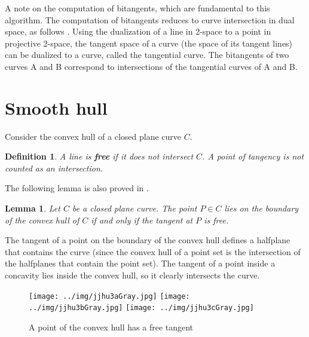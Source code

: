 \documentclass{sig-alternate}
\newcommand{\QED}{\vrule height 1.4ex width 1.0ex depth -.1ex\ \vspace{.3in}} %
\newcommand{\prf}{\noindent{{\bf Proof}:\ \ \ }}
\newtheorem{lemma}[theorem]{Lemma}
\newtheorem{defn2}[theorem]{Definition}
\begin{document}
A note on the computation of bitangents, which are fundamental to this algorithm.
The computation of bitangents reduces to curve intersection in dual space, as follows
\cite{jj01}.
Using the dualization of a line in 2-space to a point in projective 2-space,
the tangent space of a curve (the space of its tangent lines) can be dualized
to a curve, called the tangential curve.
The bitangents of two curves A and B 
correspond to intersections of the tangential curves of A and B.


\section{Smooth hull}
\label{sec:hull}

Consider the convex hull of a closed plane curve $C$.

\begin{defn2}
A line is {\bf free} if it does not intersect $C$.
A point of tangency is not counted as an intersection.
\end{defn2}

The following lemma is also proved in \cite{elber01}. 

\begin{lemma}
\label{lem:condition}
Let $C$ be a closed plane curve.
The point $P \in C$ lies on the boundary of the convex hull of $C$ if and only if
the tangent at $P$ is free.
\end{lemma}
\prf
The tangent of a point on the boundary of the convex hull 
defines a halfplane that contains the curve 
(since the convex hull of a point set is the intersection of the halfplanes 
that contain the point set).
The tangent of a point inside a concavity lies inside the convex hull, so it
clearly intersects the curve.
\QED

\begin{figure}[h]
\begin{center}
\texttt{[image: ../img/jjhu3aGray.jpg]} 
\texttt{[image: ../img/jjhu3bGray.jpg]}
\texttt{[image: ../img/jjhu3cGray.jpg]}
\end{center}
\caption{A point of the convex hull has a free tangent}
\label{fig:tangent}
\end{figure}
\end{document}
